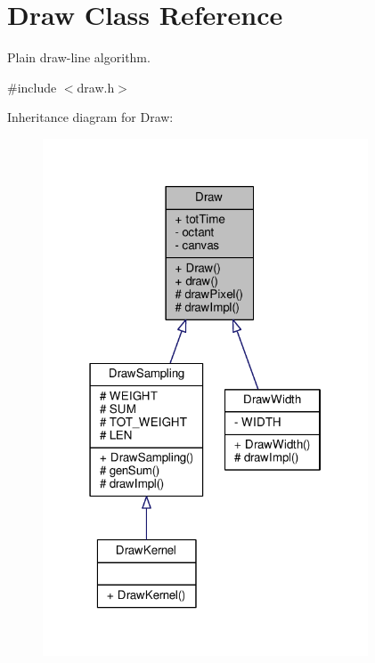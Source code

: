 \hypertarget{classDraw}{}\section{Draw Class Reference}
\label{classDraw}


Plain draw-\/line algorithm.  




{\ttfamily \#include $<$draw.\+h$>$}



Inheritance diagram for Draw\+:\nopagebreak
\begin{figure}[H]
\begin{center}
\leavevmode
\includegraphics[width=274pt]{classDraw__inherit__graph}
\end{center}
\end{figure}


